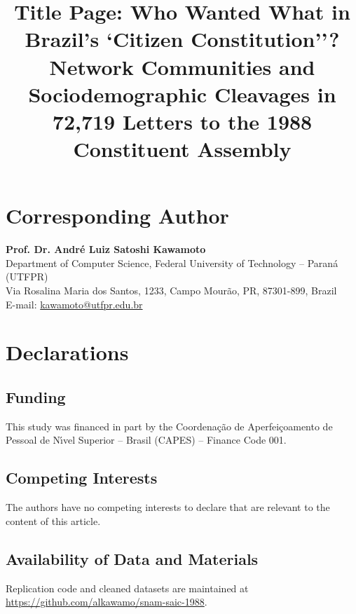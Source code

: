 \documentclass[pdflatex,sn-basic]{sn-jnl}
\begin{document}
\title[Who Wanted What in Brazil's `Citizen Constitution''?]{Title Page: Who Wanted What in Brazil's `Citizen Constitution''? Network Communities and Sociodemographic Cleavages in 72,719 Letters to the 1988 Constituent Assembly}

\author[1]{ }
\author*[1]{ }


\maketitle

\section*{Corresponding Author}
\textbf{Prof. Dr. Andr\'{e} Luiz Satoshi Kawamoto}\\
Department of Computer Science, Federal University of Technology -- Paran\'{a} (UTFPR)\\
Via Rosalina Maria dos Santos, 1233, Campo Mour\~{a}o, PR, 87301-899, Brazil\\
E-mail: \url{kawamoto@utfpr.edu.br}

\section*{Declarations}
\subsection*{Funding}
This study was financed in part by the Coordena\c{c}\~{a}o de Aperfei\c{c}oamento de Pessoal de N\'{\i}vel Superior -- Brasil (CAPES) -- Finance Code 001.

\subsection*{Competing Interests}
The authors have no competing interests to declare that are relevant to the content of this article.

\subsection*{Availability of Data and Materials}
Replication code and cleaned datasets are maintained at \url{https://github.com/alkawamo/snam-saic-1988}.
\end{document}
